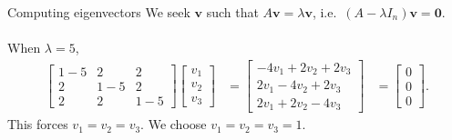 \documentclass{beamer}
\def\v{\bm{v}}
\begin{document}
        \begin{frame}{Computing eigenvectors}
                We seek $\v$ such that $A\v = \lambda\v$, i.e.\ $(A - \lambda I_n)\v = \mathbf{0}$. \\~\\

                When $\lambda = 5$,
                \begin{align*}
                        \begin{bmatrix}
                                1 - 5 & 2 & 2 \\ 2 & 1 - 5 & 2 \\ 2 & 2 & 1 - 5
                        \end{bmatrix}
                        \begin{bmatrix}
                                v_{1} \\ v_{2} \\ v_{3}
                        \end{bmatrix}
                        &= \begin{bmatrix}
                                -4v_1 + 2v_2 + 2v_3 \\
                                2v_1 - 4v_2 + 2v_3 \\
                                2v_1 + 2v_2 - 4v_3
                        \end{bmatrix}
                        &= \begin{bmatrix}
                                0 \\ 0 \\ 0
                        \end{bmatrix}.
                \end{align*}
                This forces $v_1 = v_2 = v_3$. We choose $v_1 = v_2 = v_3 = 1$.
        \end{frame}
        
\end{document}
